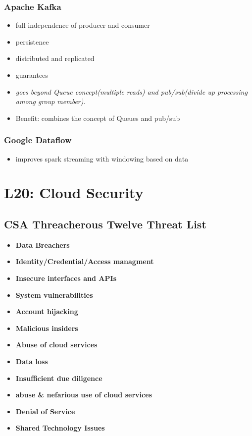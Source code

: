 \documentclass[a4paper]{article}
\begin{document}
\begin{multicols}{3}
\subsubsection{Apache Kafka}
\begin{itemize}
    \item full independence of producer and consumer
    \item persistence
    \item distributed and replicated
    \item guarantees
    \item \textit{goes beyond Queue concept(multiple reads) and pub/sub(divide up processing among group member).}
    \item Benefit: combines the concept of Queues and pub/sub
\end{itemize}

\subsubsection{Google Dataflow}
\begin{itemize}
    \item improves spark streaming with windowing based on data
\end{itemize}

\section{L20: Cloud Security}

\subsection{CSA Threacherous Twelve Threat List}
\begin{itemize}
    \item \textbf{Data Breachers}
    \item \textbf{Identity/Credential/Access managment}
    \item \textbf{Insecure interfaces and APIs}
    \item \textbf{System vulnerabilities}
    \item \textbf{Account hijacking}
    \item \textbf{Malicious insiders}
    \item \textbf{Abuse of cloud services}
    \item \textbf{Data loss}
    \item \textbf{Insufficient due diligence}
    \item \textbf{abuse \& nefarious use of cloud services}
    \item \textbf{Denial of Service}
    \item \textbf{Shared Technology Issues}
\end{itemize}


\end{multicols}
\end{document}
